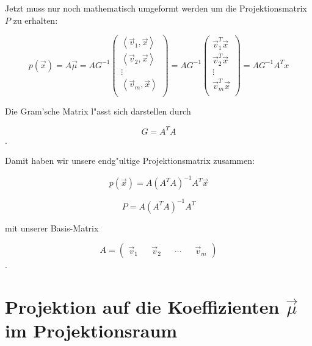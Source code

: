 \documentclass{article}
\newcommand{\lrangle}[1]{\left\langle #1 \right\rangle}
\begin{document}
Jetzt muss nur noch mathematisch umgeformt werden um die Projektionsmatrix \(P\)
zu erhalten:

    \begin{equation}
        p(\vec{x}) = A\vec{\mu} = AG^{-1}
        \begin{pmatrix}
            \lrangle{ \vec{v}_1, \vec{x} } \\
            \lrangle{ \vec{v}_2, \vec{x} } \\
            \vdots \\
            \lrangle{ \vec{v}_m, \vec{x} } \\
            \end{pmatrix}
        = AG^{-1}
        \begin{pmatrix}
            \vec{v}_{1}^{T} \vec{x} \\
            \vec{v}_{2}^{T} \vec{x} \\
            \vdots \\
            \vec{v}_{m}^{T} \vec{x} \\
        \end{pmatrix}
        = AG^{-1}A^T x
    \end{equation}

Die Gram'sche Matrix l"asst sich darstellen durch

    \begin{equation}
        G = A^T A
    \end{equation}.

Damit haben wir unsere endg"ultige Projektionsmatrix zusammen:

    \begin{equation}
        p(\vec{x}) = A(A^T A)^{-1} A^T \vec{x}
    \end{equation}

    \begin{equation}
        P = A(A^T A)^{-1} A^T
    \end{equation}

mit unserer Basis-Matrix

    \begin{equation}
        A = \begin{pmatrix} \vec{v}_1 && \vec{v}_2 && \cdots && \vec{v}_m
        \end{pmatrix}
    \end{equation}.

\section{Projektion auf die Koeffizienten \(\vec{\mu}\) im Projektionsraum}
\end{document}
